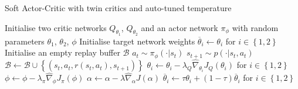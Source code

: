 {\begin{algorithm}
\caption{Soft Actor-Critic with twin critics \cite{ref:td3} and auto-tuned temperature \cite{ref:sac-auto}}
\label{alg:sac}
\begin{algorithmic}
\State Initialise two critic networks $Q_{\theta_1}$, $Q_{\theta_2}$ and an actor network $\pi_\phi$ with random parameters $\theta_1$, $\theta_2$, $\phi$
\State Initialise target network weights $\overline{\theta}_i \gets \theta_i$  for $i \in \left\{1,2\right\}$
\State Initialise an empty replay buffer $\mathcal{B}$
        \State $a_t \sim \pi_\phi(\cdot|s_t)$
        \State $s_{t+1} \sim p(\cdot|s_t,a_t)$
        \State $\mathcal{B} \gets \mathcal{B} \cup \left\{(s_t,a_t,r(s_t,a_t),s_{t+1})\right\}$
    \EndFor
        \State $\theta_i \gets \theta_i - \lambda_Q\hat\nabla_{\theta_i}J_Q(\theta_i)$ for $i \in \left\{1,2\right\}$
        \State $\phi \gets \phi - \lambda_\pi\hat\nabla_{\phi}J_\pi(\phi)$
        \State $\alpha \gets \alpha - \lambda\hat\nabla_{\alpha}J(\alpha)$
        \State $\overline{\theta}_i \gets \tau\theta_i + (1-\tau)\overline{\theta}_i$ for $i \in \left\{1,2\right\}$
    \EndFor
\EndFor
\end{algorithmic}
\end{algorithm}
}
